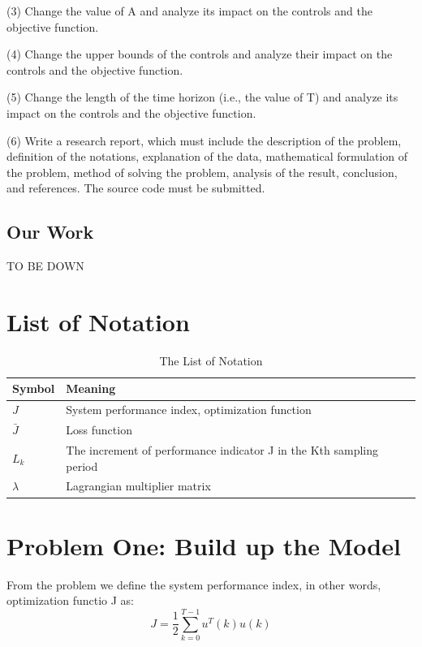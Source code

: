 \documentclass{mcmthesis}
\begin{document}
(3)	Change the value of A and analyze its impact on the controls and the objective function.

(4)	Change the upper bounds of the controls and analyze their impact on the controls and the objective function.

(5)	Change the length of the time horizon (i.e., the value of T) and analyze its impact on the controls and the objective function.

(6)	Write a research report, which must include the description of the problem, definition of the notations, explanation of the data, mathematical formulation of the problem, method of solving the problem, analysis of the result, conclusion, and references. The source code must be submitted.


\subsection{Our Work}

TO BE DOWN

\section{List of Notation}

\begin{center}
\begin{longtable}{p{}p{}m{}}
\caption{The List of Notation}\\
\hline
Symbol& Meaning \\
\hline

$J$      & System performance index, optimization function
                                                         \\
$\bar J$ & Loss function    \\
$L_k$      & The increment of performance indicator J in the Kth sampling period
                                                          \\
$\lambda$     & Lagrangian multiplier matrix
                                                                                        \\ \hline

 \end{longtable}
 \end{center}


\section{Problem One: Build up the Model}
From the problem we define the system performance index, in other words, optimization functio J as:
$$J=\frac{1}{2}\sum^{T-1}_{k=0}u^T(k)u(k)$$
\end{document}
